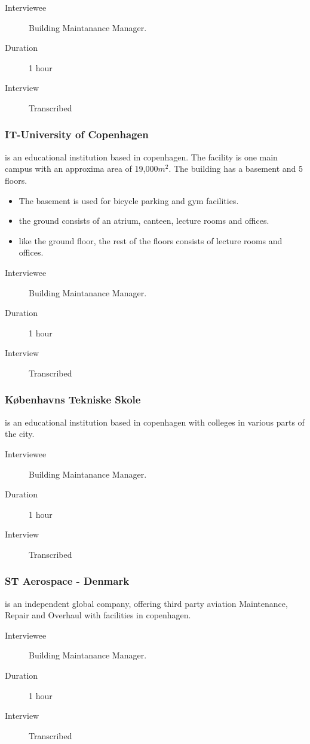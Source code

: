 \begin{description}
	\item[Interviewee] Building Maintanance Manager.
	\item[Duration] 1 hour
	\item[Interview] Transcribed
\end{description}

\subsubsection{IT-University of Copenhagen} is an educational institution based in copenhagen. The facility is one main campus with an approxima area of 19,000$m^2$. The building has a basement and 5 floors.
\begin{itemize}
	\item The basement is used for bicycle parking and gym facilities.
	\item the ground consists of an atrium, canteen, lecture rooms and offices.
	\item like the ground floor, the rest of the floors consists of lecture rooms and offices.
\end{itemize}
\begin{description}
	\item[Interviewee] Building Maintanance Manager.
	\item[Duration] 1 hour
	\item[Interview] Transcribed
\end{description}

\subsubsection{K\o benhavns Tekniske Skole} is an educational institution based in copenhagen with colleges in various parts of the city.
\begin{description}
	\item[Interviewee] Building Maintanance Manager.
	\item[Duration] 1 hour
	\item[Interview] Transcribed
\end{description}

\subsubsection{ST Aerospace - Denmark} is an independent global company, offering third party aviation Maintenance, Repair and Overhaul with facilities in copenhagen. 
\begin{description}
	\item[Interviewee] Building Maintanance Manager.
	\item[Duration] 1 hour
	\item[Interview] Transcribed
\end{description}

